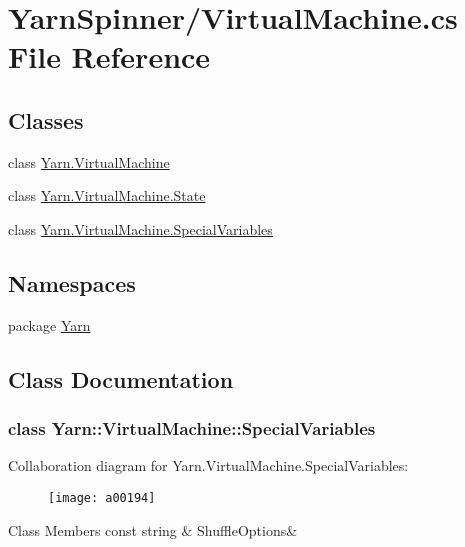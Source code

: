 \hypertarget{a00148}{\section{Yarn\-Spinner/\-Virtual\-Machine.cs File Reference}
\label{a00148}
}
\subsection*{Classes}
\begin{DoxyCompactItemize}
\item 
class \hyperlink{a00086}{Yarn.\-Virtual\-Machine}
\item 
class \hyperlink{a00089}{Yarn.\-Virtual\-Machine.\-State}
\item 
class \hyperlink{a00086_a00183}{Yarn.\-Virtual\-Machine.\-Special\-Variables}
\end{DoxyCompactItemize}
\subsection*{Namespaces}
\begin{DoxyCompactItemize}
\item 
package \hyperlink{a00040}{Yarn}
\end{DoxyCompactItemize}


\subsection{Class Documentation}
\label{a00183}
\hypertarget{a00086_a00183}{}
\subsubsection{class Yarn\-:\-:Virtual\-Machine\-:\-:Special\-Variables}


Collaboration diagram for Yarn.\-Virtual\-Machine.\-Special\-Variables\-:
\nopagebreak
\begin{figure}[H]
\begin{center}
\leavevmode
\texttt{[image: a00194]}
\end{center}
\end{figure}
\begin{DoxyFields}{Class Members}
\hypertarget{a00086_aecbb8ab9becd96457d836100b2818078}{const string}\label{a00086_aecbb8ab9becd96457d836100b2818078}
&
Shuffle\-Options&
\\
\hline

\end{DoxyFields}
